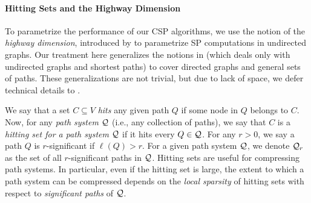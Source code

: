 \paragraph{Hitting Sets and the Highway Dimension}
\label{ssec:hddef}
To parametrize the performance of our CSP algorithms, we use the notion of the \emph{highway dimension}, introduced by \citet{highway2013,highway2010} to parametrize SP computations in undirected graphs. 
Our treatment here generalizes the notions in \citep{highway2013} (which deals only with undirected graphs and shortest paths) to cover directed graphs and general sets of paths.
These generalizations are not trivial, but due to lack of space, we defer technical details to \cite{TechReport}. 


We say that a set $C\subseteq V$ \emph{hits} any given path $Q$ if some node in $Q$ belongs to $C$. Now, for any \emph{path system} $\mathcal{Q}$ (i.e., any collection of paths), we say that $C$ is a \emph{hitting set for a path system} $\mathcal{Q}$ if it hits every $Q\in\mathcal{Q}$. 
For any $r>0$, we say a path $Q$ is $r$-significant if $\ell(Q)>r$. 
For a given path system $\mathcal{Q}$, we denote $\mathcal{Q}_r$ as the set of all $r$-significant paths in $\mathcal{Q}$.
Hitting sets are useful for compressing path systems. 
In particular, even if the hitting set is large, the extent to which a path system can be compressed depends on the \emph{local sparsity} of hitting sets with respect to \emph{significant paths} of $\mathcal{Q}$.




